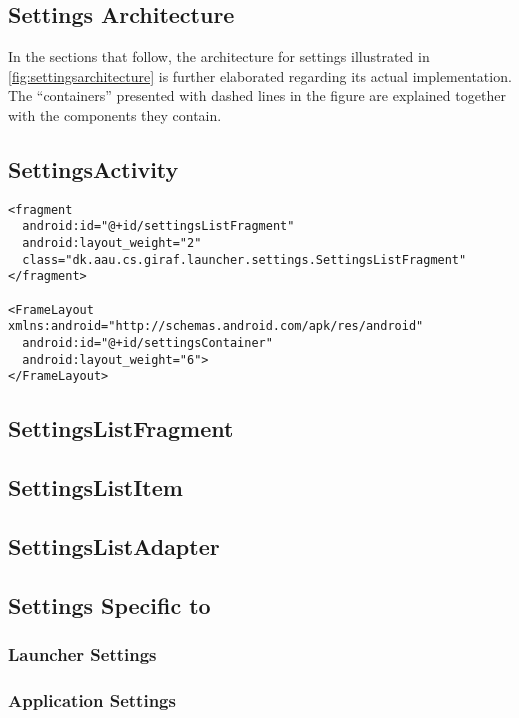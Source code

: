 \subsection{Settings Architecture}
In the sections that follow, the architecture for settings illustrated in \cref{fig:settingsarchitecture} is further elaborated regarding its actual implementation.
The ``containers'' presented with dashed lines in the figure are explained together with the components they contain.

\subsection{SettingsActivity}

\begin{lstlisting}[caption={Excerpt of the layout defined for \lstinline|SettingsActivity|.}, label={lst:settingsactivity:layout}]
<fragment
  android:id="@+id/settingsListFragment"
  android:layout_weight="2"
  class="dk.aau.cs.giraf.launcher.settings.SettingsListFragment"
</fragment>

<FrameLayout xmlns:android="http://schemas.android.com/apk/res/android"
  android:id="@+id/settingsContainer"
  android:layout_weight="6">
</FrameLayout>
\end{lstlisting}


\subsection{SettingsListFragment}

\subsection{SettingsListItem}

\subsection{SettingsListAdapter}

\subsection{Settings Specific to \launcher}

\subsubsection{Launcher Settings}


\subsubsection{Application Settings}
